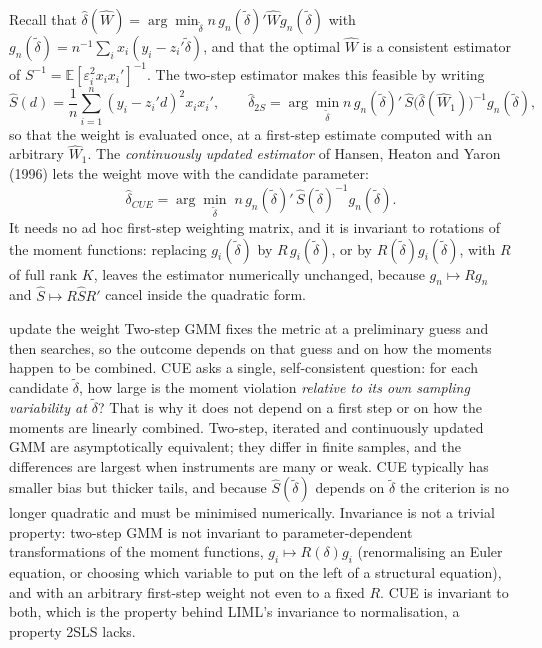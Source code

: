 \documentclass[11pt,a4paper]{article}
\newcommand{\E}{\mathbb{E}}
\newcommand{\dhat}{\hat\delta}
\begin{document}
Recall that $\dhat(\hat W)=\arg\min_{\tilde\delta}n\,g_n(\tilde\delta)'\hat Wg_n(\tilde\delta)$ with $g_n(\tilde\delta)=n^{-1}\sum_ix_i(y_i-z_i'\tilde\delta)$, and that the optimal $\hat W$ is a consistent estimator of $S^{-1}=\E[\varepsilon_i^2x_ix_i']^{-1}$. The two-step estimator makes this feasible by writing
\[
\hat S(d)=\frac1n\sum_{i=1}^n(y_i-z_i'd)^2x_ix_i',\qquad\dhat_{2S}=\arg\min_{\tilde\delta}n\,g_n(\tilde\delta)'\,\hat S\big(\dhat(\hat W_1)\big)^{-1}g_n(\tilde\delta),
\]
so that the weight is evaluated once, at a first-step estimate computed with an arbitrary $\hat W_1$. The \emph{continuously updated estimator} of Hansen, Heaton and Yaron (1996) lets the weight move with the candidate parameter:
\begin{equation}\label{eq:cue}
\dhat_{CUE}=\arg\min_{\tilde\delta}\;n\,g_n(\tilde\delta)'\,\hat S(\tilde\delta)^{-1}g_n(\tilde\delta).
\end{equation}
It needs no ad hoc first-step weighting matrix, and it is invariant to rotations of the moment functions: replacing $g_i(\tilde\delta)$ by $R\,g_i(\tilde\delta)$, or by $R(\tilde\delta)g_i(\tilde\delta)$, with $R$ of full rank $K$, leaves the estimator numerically unchanged, because $g_n\mapsto Rg_n$ and $\hat S\mapsto R\hat SR'$ cancel inside the quadratic form.

\begin{whybox}{update the weight}
Two-step GMM fixes the metric at a preliminary guess and then searches, so the outcome depends on that guess and on how the moments happen to be combined. CUE asks a single, self-consistent question: for each candidate $\tilde\delta$, how large is the moment violation \emph{relative to its own sampling variability at $\tilde\delta$}? That is why it does not depend on a first step or on how the moments are linearly combined. Two-step, iterated and continuously updated GMM are asymptotically equivalent; they differ in finite samples, and the differences are largest when instruments are many or weak. CUE typically has smaller bias but thicker tails, and because $\hat S(\tilde\delta)$ depends on $\tilde\delta$ the criterion is no longer quadratic and must be minimised numerically. Invariance is not a trivial property: two-step GMM is not invariant to parameter-dependent transformations of the moment functions, $g_i\mapsto R(\delta)g_i$ (renormalising an Euler equation, or choosing which variable to put on the left of a structural equation), and with an arbitrary first-step weight not even to a fixed $R$. CUE is invariant to both, which is the property behind LIML's invariance to normalisation, a property 2SLS lacks.
\end{whybox}
\end{document}
